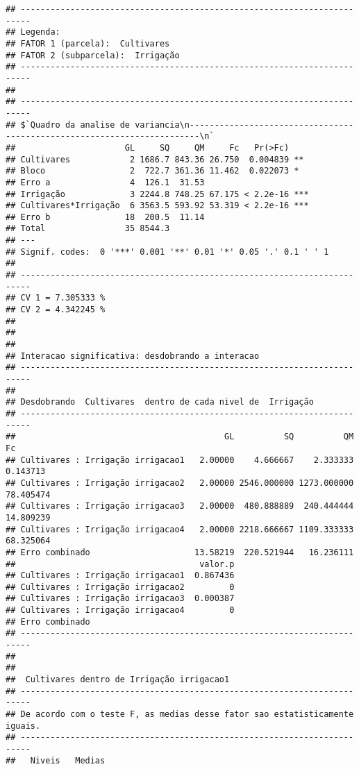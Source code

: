 \documentclass[
]{article}
\begin{document}
\begin{verbatim}
## ------------------------------------------------------------------------
## Legenda:
## FATOR 1 (parcela):  Cultivares 
## FATOR 2 (subparcela):  Irrigação 
## ------------------------------------------------------------------------
## 
## ------------------------------------------------------------------------
## $`Quadro da analise de variancia\n------------------------------------------------------------------------\n`
##                      GL     SQ     QM     Fc   Pr(>Fc)    
## Cultivares            2 1686.7 843.36 26.750  0.004839 ** 
## Bloco                 2  722.7 361.36 11.462  0.022073 *  
## Erro a                4  126.1  31.53                     
## Irrigação             3 2244.8 748.25 67.175 < 2.2e-16 ***
## Cultivares*Irrigação  6 3563.5 593.92 53.319 < 2.2e-16 ***
## Erro b               18  200.5  11.14                     
## Total                35 8544.3                            
## ---
## Signif. codes:  0 '***' 0.001 '**' 0.01 '*' 0.05 '.' 0.1 ' ' 1
## 
## ------------------------------------------------------------------------
## CV 1 = 7.305333 %
## CV 2 = 4.342245 %
## 
## 
## 
## Interacao significativa: desdobrando a interacao
## ------------------------------------------------------------------------
## 
## Desdobrando  Cultivares  dentro de cada nivel de  Irrigação 
## ------------------------------------------------------------------------
##                                          GL          SQ          QM        Fc
## Cultivares : Irrigação irrigacao1   2.00000    4.666667    2.333333  0.143713
## Cultivares : Irrigação irrigacao2   2.00000 2546.000000 1273.000000 78.405474
## Cultivares : Irrigação irrigacao3   2.00000  480.888889  240.444444 14.809239
## Cultivares : Irrigação irrigacao4   2.00000 2218.666667 1109.333333 68.325064
## Erro combinado                     13.58219  220.521944   16.236111          
##                                     valor.p
## Cultivares : Irrigação irrigacao1  0.867436
## Cultivares : Irrigação irrigacao2         0
## Cultivares : Irrigação irrigacao3  0.000387
## Cultivares : Irrigação irrigacao4         0
## Erro combinado                             
## ------------------------------------------------------------------------
## 
## 
##  Cultivares dentro de Irrigação irrigacao1
## ------------------------------------------------------------------------
## De acordo com o teste F, as medias desse fator sao estatisticamente iguais.
## ------------------------------------------------------------------------
##   Niveis   Medias

\end{verbatim}
\end{document}
